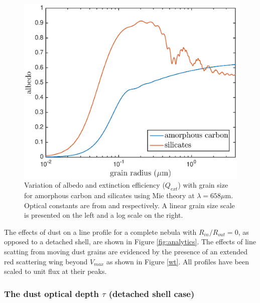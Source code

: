 \documentclass[useAMS,usenatbib,usegraphicx]{mnras}
\begin{document}
\begin{figure}
\begin{center}
\includegraphics[trim =37 10 45 15,clip=true,scale=0.41]{albedo_grainsize_upto4_log}
\caption{Variation of albedo and extinction efficiency ($Q_{ext}$) with grain size for amorphous carbon and silicates using Mie theory at $\lambda = 658 \mu $m. Optical constants are from \citet{Zubko1996} and \citet{Draine1984} respectively. A linear grain size scale is presented on the left and a log scale on the right.}
\label{albedo_grain}
\end{center}
\end{figure}

The effects of dust on a line profile for a complete nebula with $R_{in}/R_{out}=0$, as opposed 
to a detached shell, are shown in Figure \ref{fig:analytics}.  
The effects of line scatting from moving dust grains are evidenced 
by the presence of an extended red scattering wing beyond $V_{max}$ as shown in Figure \ref{wt}. 
All profiles have been scaled to unit flux at their peaks.



\subsubsection{The dust optical depth $\tau$ (detached shell case)}
\label{tau}
\end{document}
